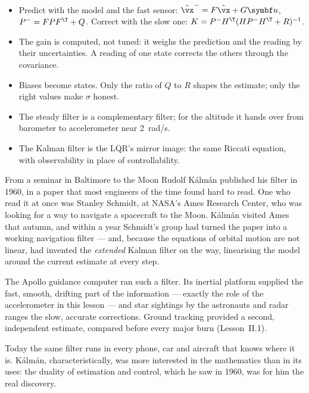 \begin{remember}
\begin{itemize}
  \item Predict with the model and the fast sensor: $\hat{\vx}^- = F\hat{\vx} + G\symbf u$, $P^- = FPF^\T + Q$. Correct with the slow one: $K = P^-H^\T(HP^-H^\T + R)^{-1}$.
  \item The gain is computed, not tuned: it weighs the prediction and the reading by their uncertainties. A reading of one state corrects the others through the covariance.
  \item Biases become states. Only the ratio of $Q$ to $R$ shapes the estimate; only the right values make $\sigma$ honest.
  \item The steady filter is a complementary filter; for the altitude it hands over from barometer to accelerometer near \SI{2}{rad/s}.
  \item The Kalman filter is the LQR's mirror image: the same Riccati equation, with observability in place of controllability.
\end{itemize}
\end{remember}

\begin{curiosity}{From a seminar in Baltimore to the Moon}
Rudolf Kálmán published his filter in 1960, in a paper that most engineers of the time found hard to read. One who read it at once was Stanley Schmidt, at NASA's Ames Research Center, who was looking for a way to navigate a spacecraft to the Moon. Kálmán visited Ames that autumn, and within a year Schmidt's group had turned the paper into a working navigation filter — and, because the equations of orbital motion are not linear, had invented the \emph{extended} Kalman filter on the way, linearising the model around the current estimate at every step.

The Apollo guidance computer ran such a filter. Its inertial platform supplied the fast, smooth, drifting part of the information — exactly the role of the accelerometer in this lesson — and star sightings by the astronauts and radar ranges the slow, accurate corrections. Ground tracking provided a second, independent estimate, compared before every major burn (Lesson~II.1).

Today the same filter runs in every phone, car and aircraft that knows where it is. Kálmán, characteristically, was more interested in the mathematics than in its uses: the duality of estimation and control, which he saw in 1960, was for him the real discovery.
\end{curiosity}

